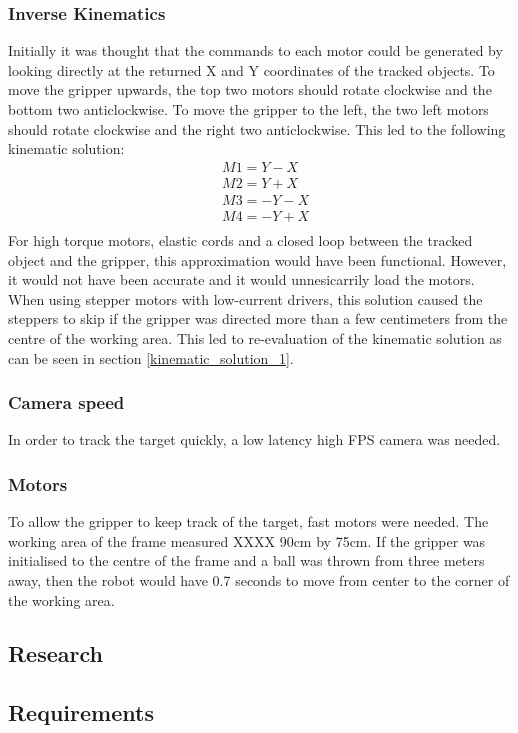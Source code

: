 \documentclass[conference]{IEEEtran}
\begin{document}
\subsubsection{Inverse Kinematics}
Initially it was thought that the commands to each motor could be generated by looking directly at the returned X and Y coordinates of the tracked objects. To move the gripper upwards, the top two motors should rotate clockwise and the bottom two anticlockwise. To move the gripper to the left, the two left motors should rotate clockwise and the right two anticlockwise. This led to the following kinematic solution:
\begin{equation}
\begin{aligned}
&M1 = Y - X \\
&M2 = Y + X\\
&M3 = -Y -X\\
&M4 = -Y + X\\
\end{aligned}
\end{equation}
For high torque motors, elastic cords and a closed loop between the tracked object and the gripper, this approximation would have been functional. However, it would not have been accurate and it would unnesicarrily load the motors. When using stepper motors with low-current drivers, this solution caused the steppers to skip if the gripper was directed more than a few centimeters from the centre of the working area. 
This led to re-evaluation of the kinematic solution as can be seen in section \ref{kinematic_solution_1}.

\subsubsection{Camera speed}
In order to track the target quickly, a low latency high FPS camera was needed.
\subsubsection{Motors}
To allow the gripper to keep track of the target, fast motors were needed. The working area of the frame measured XXXX 90cm by 75cm. If the gripper was initialised to the centre of the frame and a ball was thrown from three meters away, then the robot would have 0.7 seconds to move from center to the corner of the working area. 
\subsection{Research}
\subsection{Requirements}
\end{document}
